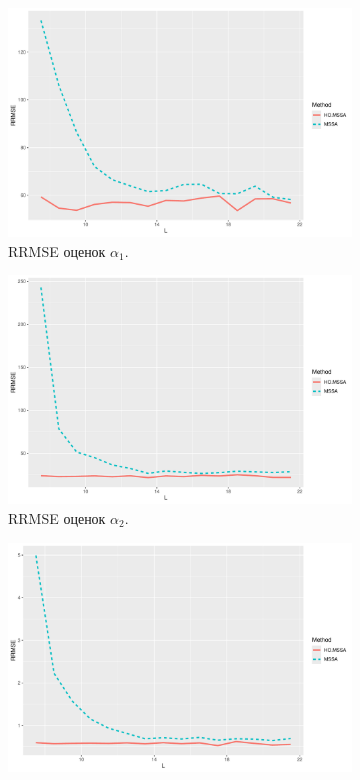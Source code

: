 \documentclass[specialist,
  substylefile=spbu.rtx,
subf,href,colorlinks=true, 12pt]{disser}
\theoremstyle{plain}
\theoremstyle{definition}
\theoremstyle{remark}
\begin{document}
\begin{figure}[!ht]
  \centering
  \begin{subfigure}{0.49\linewidth}
    \includegraphics[width=\linewidth]{rate1_L.pdf}
    \caption{RRMSE оценок $\alpha_1$.}
    \label{fig:rate1_L}
  \end{subfigure}
  \begin{subfigure}{0.49\linewidth}
    \includegraphics[width=\linewidth]{rate2_L.pdf}
    \caption{RRMSE оценок $\alpha_2$.}
    \label{fig:rate2_L}
  \end{subfigure}
  \begin{subfigure}{0.49\linewidth}
    \includegraphics[width=\linewidth]{freq1_L.pdf}

\end{subfigure}
\end{figure}
\end{document}
